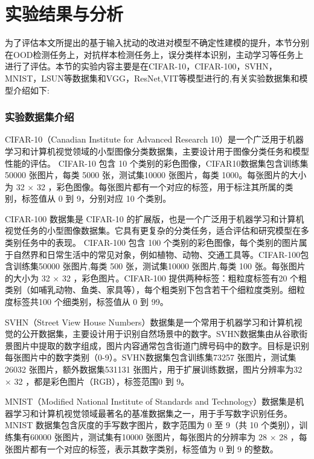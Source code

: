 \section{实验结果与分析}
为了评估本文所提出的基于输入扰动的改进对模型不确定性建模的提升，本节分别在OOD检测任务上，对抗样本检测任务上，误分类样本识别，主动学习等任务上进行了评估。本节的实验内容主要是在CIFAR-10\cite{Krizhevsky2009}，CIFAR-100\cite{Krizhevsky2009}，SVHN\cite{Netzer2011}，MNIST\cite{LeCun1998}，LSUN\cite{Yu2015}等数据集和VGG\cite{simonyan2014very}，ResNet\cite{he2016deep},VIT\cite{dosovitskiy2020image}等模型进行的,有关实验数据集和模型介绍如下:

\subsubsection{实验数据集介绍}


CIFAR-10（Canadian Institute for Advanced Research 10）是一个广泛用于机器学习和计算机视觉领域的小型图像分类数据集，主要设计用于图像分类任务和模型性能的评估。 CIFAR-10 包含 10 个类别的彩色图像，CIFAR10数据集包含训练集50000 张图片，每类 5000 张，测试集10000 张图片，每类 1000。每张图片的大小为 32 × 32 ，彩色图像。每张图片都有一个对应的标签，用于标注其所属的类别，标签值从 0 到 9，分别对应 10 个类别。

CIFAR-100 数据集是 CIFAR-10 的扩展版，也是一个广泛用于机器学习和计算机视觉任务的小型图像数据集。它具有更复杂的分类任务，适合评估和研究模型在多类别任务中的表现。 CIFAR-100 包含 100 个类别的彩色图像，每个类别的图片属于自然界和日常生活中的常见对象，例如植物、动物、交通工具等。CIFAR-100包含训练集50000 张图片,每类 500 张，测试集10000 张图片,每类 100 张。每张图片的大小为 32 × 32 ，彩色图片。CIFAR-100 提供两种标签：粗粒度标签有20 个粗类别（如哺乳动物、鱼类、家具等），每个粗类别下包含若干个细粒度类别。细粒度标签共100 个细类别，标签值从 0 到 99。

SVHN（Street View House Numbers）数据集是一个常用于机器学习和计算机视觉的公开数据集，主要设计用于识别自然场景中的数字。SVHN数据集由从谷歌街景图片中提取的数字组成，图片内容通常包含街道门牌号码中的数字。目标是识别每张图片中的数字类别（0-9）。SVHN数据集包含训练集73257 张图片，测试集26032 张图片，额外数据集531131 张图片，用于扩展训练数据，图片分辨率为32 × 32 ，都是彩色图片（RGB），标签范围0 到 9。

MNIST（Modified National Institute of Standards and Technology）数据集是机器学习和计算机视觉领域最著名的基准数据集之一，用于手写数字识别任务。 MNIST 数据集包含灰度的手写数字图片，数字范围为 0 至 9（共 10 个类别），训练集有60000 张图片，测试集有10000 张图片，每张图片的分辨率为 28 × 28 ，每张图片都有一个对应的标签，表示其数字类别，标签值为 0 到 9 的整数。


